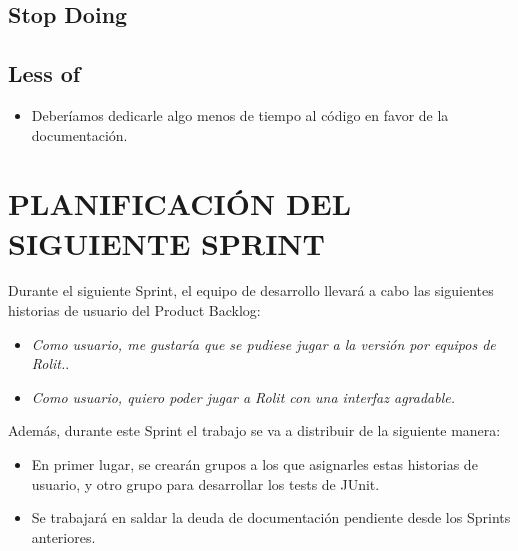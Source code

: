 \documentclass{article}
\begin{document}
\subsection{Stop Doing}


\subsection{Less of}
\begin{itemize}
\item Deberíamos dedicarle algo menos de tiempo al código en favor de la documentación.
\end{itemize}

\section{PLANIFICACIÓN DEL SIGUIENTE SPRINT}
Durante el siguiente Sprint, el equipo de desarrollo llevará a cabo las siguientes historias de usuario del Product Backlog:
\begin{itemize}
\item \textit{Como usuario, me gustaría que se pudiese jugar a la versión por equipos de Rolit.}.
\item \textit{Como usuario, quiero poder jugar a Rolit con una interfaz agradable.}

\end{itemize}
Además, durante este Sprint el trabajo se va a distribuir de la siguiente manera:
\begin{itemize}
\item En primer lugar, se crearán grupos a los que asignarles estas historias de usuario, y otro grupo para desarrollar los tests de JUnit.
\item Se trabajará en saldar la deuda de documentación pendiente desde los Sprints anteriores.

\end{itemize}
\end{document}
